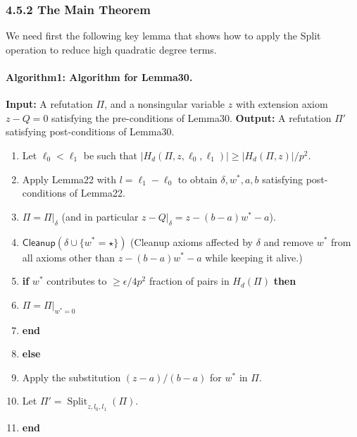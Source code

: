 \documentclass[10pt,a4paper]{article}
\DeclareMathOperator{\Split}{Split}
\begin{document}
\subsubsection*{4.5.2 The Main Theorem}
We need first the following key lemma that shows how to apply the Split operation to reduce high quadratic degree terms.
\paragraph{Algorithm1: Algorithm for Lemma30.}
\textbf{Input:} A refutation $\Pi$, and a nonsingular variable $z$ with extension axiom $z-Q=0$ satisfying the pre-conditions of Lemma30.
\textbf{Output:} A refutation $\Pi'$ satisfying post-conditions of Lemma30.
\begin{enumerate}[label=\arabic*,leftmargin=*]
\item Let $\ell_0<\ell_1$ be such that $|H_d(\Pi,z,\ell_0,\ell_1)|\geq|H_d(\Pi,z)|/p^2$.
\item Apply Lemma22 with $l=\ell_1-\ell_0$ to obtain $\delta,w^*,a,b$ satisfying post-conditions of Lemma22.
\item $\Pi=\Pi|_{\delta}$ (and in particular $z-Q|_{\delta}=z-(b-a)w^*-a$).
\item $\mathsf{Cleanup}(\delta\cup\{w^*=\star\})$ (Cleanup axioms affected by $\delta$ and remove $w^*$ from all axioms other than $z-(b-a)w^*-a$ while keeping it alive.)
\item \textbf{if} $w^*$ contributes to $\geq\epsilon/4p^2$ fraction of pairs in $H_d(\Pi)$ \textbf{then}
\item $\Pi=\Pi|_{w^*=0}$
\item \textbf{end}
\item \textbf{else}
\item Apply the substitution $(z-a)/(b-a)$ for $w^*$ in $\Pi$.
\item Let $\Pi'=\Split_{z,l_0,l_1}(\Pi)$.
\item \textbf{end}
\end{enumerate}
\end{document}
